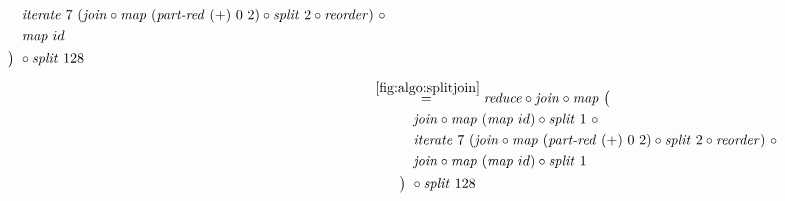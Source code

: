 \begin{align*}
\begin{aligned}
    &\qquad\quad\iterateN\ 7\ (\join \circ \map\ (\partRed\ (+)\ 0\ 2) \circ \splitN\ 2\circ \reorder)\ \circ\\
    &\qquad\quad\map\ id\\
    &\qquad\big)\ \circ \splitN\ 128
  \end{aligned}\\[.5em]
%
  &\hspace{-2em}\quad\begin{aligned}
    &\overset{\ref{fig:algo:splitjoin}}{=\hspace{.2em}}
      \reduce \circ \join \circ \map\ \big(\\
    &\qquad\quad\join \circ \map\ (\map\ id) \circ \splitN\ 1\ \circ\\
    &\qquad\quad\iterateN\ 7\ (\join \circ \map\ (\partRed\ (+)\ 0\ 2) \circ \splitN\ 2\circ \reorder)\ \circ\\
    &\qquad\quad\join \circ \map\ (\map\ id) \circ \splitN\ 1\\
    &\qquad\big)\ \circ \splitN\ 128
  \end{aligned}\\[.5em]
%
\end{align*}

